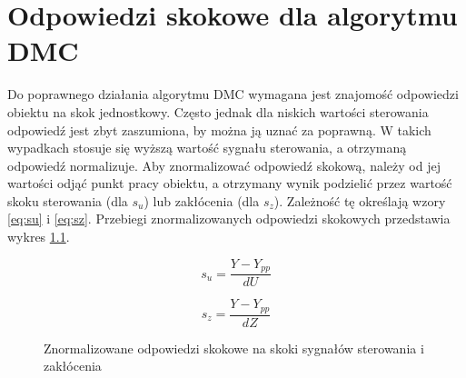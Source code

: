\chapter{Odpowiedzi skokowe dla algorytmu DMC}
Do poprawnego działania algorytmu DMC wymagana jest znajomość odpowiedzi obiektu na skok jednostkowy. Często jednak dla niskich wartości sterowania odpowiedź jest zbyt zaszumiona, by można ją uznać za poprawną. W takich wypadkach stosuje się wyższą wartość sygnału sterowania, a otrzymaną odpowiedź normalizuje. Aby znormalizować odpowiedź skokową, należy od jej wartości odjąć punkt pracy obiektu, a otrzymany wynik podzielić przez wartość skoku sterowania (dla $s_u$) lub zakłócenia (dla $s_z$). Zależność tę określają wzory \ref{eq:su} i \ref{eq:sz}. Przebiegi znormalizowanych odpowiedzi skokowych przedstawia wykres \ref{fig:s}.

\begin{equation} \label{eq:su}
s_u=\frac{Y-Y_{pp}}{dU}
\end{equation}

\begin{equation} \label{eq:sz}
s_z=\frac{Y-Y_{pp}}{dZ}
\end{equation}

\begin{figure}[tb]
\centering
{}
\caption{Znormalizowane odpowiedzi skokowe na skoki sygnałów sterowania i zakłócenia}
\label{fig:s}
\end{figure}